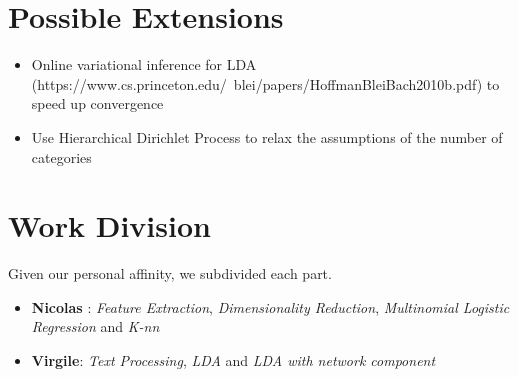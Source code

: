 \documentclass[submit]{harvardml}
\begin{document}
\section{Possible Extensions}

\begin{itemize}
	\item Online variational inference for LDA (https://www.cs.princeton.edu/~blei/papers/HoffmanBleiBach2010b.pdf) to speed up convergence
	\item Use Hierarchical Dirichlet Process to relax the assumptions of the number of categories

\end{itemize}

\section{Work Division}

Given our personal affinity, we subdivided each part. 
\begin{itemize}
	\item \textbf{Nicolas} : \textit{Feature Extraction}, \textit{Dimensionality Reduction}, \textit{Multinomial Logistic Regression} and \textit{K-nn}
	\item \textbf{Virgile}: \textit{Text Processing}, \textit{LDA} and \textit{LDA with network component}
\end{itemize}
\end{document}
